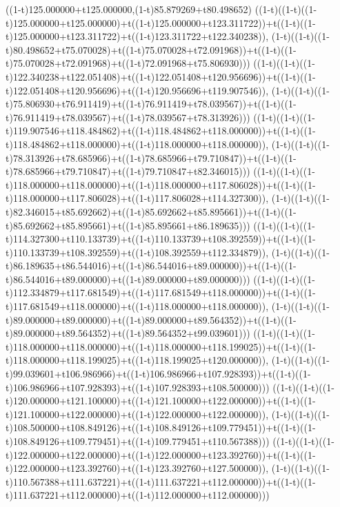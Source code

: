 ((1-t)125.000000+t125.000000,(1-t)85.879269+t80.498652)
((1-t)((1-t)((1-t)125.000000+t125.000000)+t((1-t)125.000000+t123.311722))+t((1-t)((1-t)125.000000+t123.311722)+t((1-t)123.311722+t122.340238)),                                     (1-t)((1-t)((1-t)80.498652+t75.070028)+t((1-t)75.070028+t72.091968))+t((1-t)((1-t)75.070028+t72.091968)+t((1-t)72.091968+t75.806930)))
((1-t)((1-t)((1-t)122.340238+t122.051408)+t((1-t)122.051408+t120.956696))+t((1-t)((1-t)122.051408+t120.956696)+t((1-t)120.956696+t119.907546)),                                     (1-t)((1-t)((1-t)75.806930+t76.911419)+t((1-t)76.911419+t78.039567))+t((1-t)((1-t)76.911419+t78.039567)+t((1-t)78.039567+t78.313926)))
((1-t)((1-t)((1-t)119.907546+t118.484862)+t((1-t)118.484862+t118.000000))+t((1-t)((1-t)118.484862+t118.000000)+t((1-t)118.000000+t118.000000)),                                     (1-t)((1-t)((1-t)78.313926+t78.685966)+t((1-t)78.685966+t79.710847))+t((1-t)((1-t)78.685966+t79.710847)+t((1-t)79.710847+t82.346015)))
((1-t)((1-t)((1-t)118.000000+t118.000000)+t((1-t)118.000000+t117.806028))+t((1-t)((1-t)118.000000+t117.806028)+t((1-t)117.806028+t114.327300)),                                     (1-t)((1-t)((1-t)82.346015+t85.692662)+t((1-t)85.692662+t85.895661))+t((1-t)((1-t)85.692662+t85.895661)+t((1-t)85.895661+t86.189635)))
((1-t)((1-t)((1-t)114.327300+t110.133739)+t((1-t)110.133739+t108.392559))+t((1-t)((1-t)110.133739+t108.392559)+t((1-t)108.392559+t112.334879)),                                     (1-t)((1-t)((1-t)86.189635+t86.544016)+t((1-t)86.544016+t89.000000))+t((1-t)((1-t)86.544016+t89.000000)+t((1-t)89.000000+t89.000000)))
((1-t)((1-t)((1-t)112.334879+t117.681549)+t((1-t)117.681549+t118.000000))+t((1-t)((1-t)117.681549+t118.000000)+t((1-t)118.000000+t118.000000)),                                     (1-t)((1-t)((1-t)89.000000+t89.000000)+t((1-t)89.000000+t89.564352))+t((1-t)((1-t)89.000000+t89.564352)+t((1-t)89.564352+t99.039601)))
((1-t)((1-t)((1-t)118.000000+t118.000000)+t((1-t)118.000000+t118.199025))+t((1-t)((1-t)118.000000+t118.199025)+t((1-t)118.199025+t120.000000)),                                     (1-t)((1-t)((1-t)99.039601+t106.986966)+t((1-t)106.986966+t107.928393))+t((1-t)((1-t)106.986966+t107.928393)+t((1-t)107.928393+t108.500000)))
((1-t)((1-t)((1-t)120.000000+t121.100000)+t((1-t)121.100000+t122.000000))+t((1-t)((1-t)121.100000+t122.000000)+t((1-t)122.000000+t122.000000)),                                     (1-t)((1-t)((1-t)108.500000+t108.849126)+t((1-t)108.849126+t109.779451))+t((1-t)((1-t)108.849126+t109.779451)+t((1-t)109.779451+t110.567388)))
((1-t)((1-t)((1-t)122.000000+t122.000000)+t((1-t)122.000000+t123.392760))+t((1-t)((1-t)122.000000+t123.392760)+t((1-t)123.392760+t127.500000)),                                     (1-t)((1-t)((1-t)110.567388+t111.637221)+t((1-t)111.637221+t112.000000))+t((1-t)((1-t)111.637221+t112.000000)+t((1-t)112.000000+t112.000000)))
